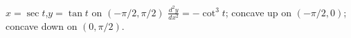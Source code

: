 {$x=\sec t$,\quad  $y=\tan t$ on $(-\pi/2,\pi/2)$}
{$\frac{d^2y}{dx^2}=-\cot^3 t$; concave up on $(-\pi/2,0)$; concave down on $(0,\pi/2)$.}

